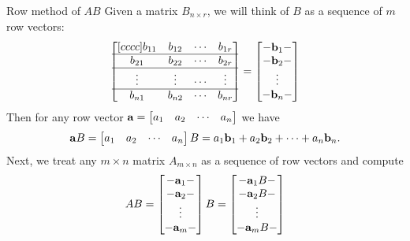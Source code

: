 \begin{frame}{Row method of $AB$}\footnotesize
Given a matrix $B_{n\times r}$, we will think of $B$ as a sequence of $m$ row vectors:
\[
\begin{bmatrix}[cccc]
b_{11}&b_{12}&\cdots &b_{1r}\\
\hline
b_{21}&b_{22}&\cdots &b_{2r}\\
\hline
\vdots&\vdots &\cdots&\vdots \\
\hline
b_{n1}&b_{n2}&\cdots&b_{nr}
\end{bmatrix}
=
\begin{bmatrix}
-{\mathbf b}_1-\\ -{\mathbf b}_2- \\ \vdots \\ -{\mathbf b}_n-
\end{bmatrix}
\]
\pause Then for any row vector ${\mathbf a}=\begin{bmatrix}
a_1&a_2&\cdots &a_n
\end{bmatrix}$ we have  
\[
{\mathbf a} B=\begin{bmatrix}
a_1&a_2&\cdots &a_n
\end{bmatrix}B=
a_1{\mathbf b}_1+a_2{\mathbf b}_2+\cdots +a_n{\mathbf b}_n.
\]
\pause Next, we treat any $m\times n$ matrix $A_{m\times n}$ as a sequence of row vectors and compute
\[
AB=\begin{bmatrix}-{\mathbf a}_1- \\ -{\mathbf a}_2- \\ \vdots \\ -{\mathbf a}_m- \end{bmatrix}B
=
\begin{bmatrix}-{\mathbf a}_1B- \\ -{\mathbf a}_2B- \\ \vdots \\ -{\mathbf a}_mB- \end{bmatrix}
\]
\end{frame}
